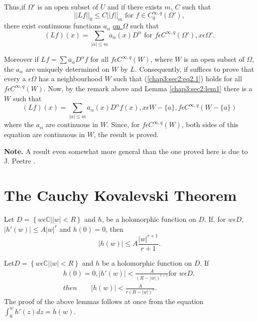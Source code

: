 Thus,\pageoriginale if $\Omega'$ is an open subset of $U$ and if there exists $m$,
$C$ such that 
$$
|| Lf ||_0 \le C || f ||_m \text{ for } f \in C^{\infty,q}_0
(\Omega'), 
$$
there exist continuous functions $a_\alpha$ \underline{on $\Omega$} such that
$$
(Lf) (x) = \sum_{|\alpha|\le m} a_\alpha (x) D^\alpha \text{ for } f
\epsilon C^{\infty,q} (\Omega'), x \epsilon \Omega'. 
$$

Moreover if $Lf =\sum a_\alpha D^\alpha f$ for all $f \epsilon
C^{\infty,q} (W)$, where $W$ is an open subset of $\Omega$, the
$a_\alpha$ are uniquely determined on $W$ by $L$. Consequently, if
suffices to prove that every a $\epsilon \Omega$ has a
neighbourhood $W$ such that (\ref{chap3:sec2:eq2.1}) holds for all $f \epsilon
C^{\infty, q} (W)$. Now, by the remark above and Lemma
\ref{chap3:sec2:lem1} there is a $W$ such that 
$$
(Lf) (x) = \sum_{|\alpha| \le m} a_\alpha (x) D^\alpha f (x), x
\epsilon W - \{ a \}, f \epsilon C^{\infty,q} (W-\{a\}) 
$$
where the $a_\alpha$ are continuous in $W$. Since, for $f \epsilon
C^{\infty,q} (W)$, both sides of this equation are continuous in $W$,
the result is proved. 

\noindent
\textbf{Note.} A result even somewhat more general than the one proved
here is due to J. Peetre \cite{35}. 

\section{The Cauchy Kovalevski Theorem}\label{chap3:sec3} %

\setcounter{lemma}{0}
\begin{lemma}\label{chap3:sec3:lem1} %
  Let $D = \left\{ w \epsilon \mathbb{C} \big| |w| < R\right\}$ and
  $h$, be a holomorphic function on $D$. If, for $w \epsilon D$,
  $|h' (w)| \le A |w|^r$ and $h (0) = 0$, then 
  $$
  |h (w)| \le A \frac{|w|^{r+1}}{r+1}.
  $$
\end{lemma}

\begin{lemma}\label{chap3:sec3:lem2}%
  Let\pageoriginale $D = \left\{ w \epsilon \mathbb{C} \big| |w| < R\right\}$ and
  $h$ be a holomorphic function on $D$. If 
  \begin{gather*}
    h (0) = 0, \left| h' (w) \right| <\frac{A}{(R - |w|)^{r+1}} \text{
      for } w \epsilon D,\\  
    then \qquad \left| h (w) \right| < \frac{A}{r (R-|w|)^r}.
  \end{gather*}
  The proof of the above lemmas follows at once from the
  equation $\int_0^w h'(z) dz = h(w)$.  
\end{lemma}

